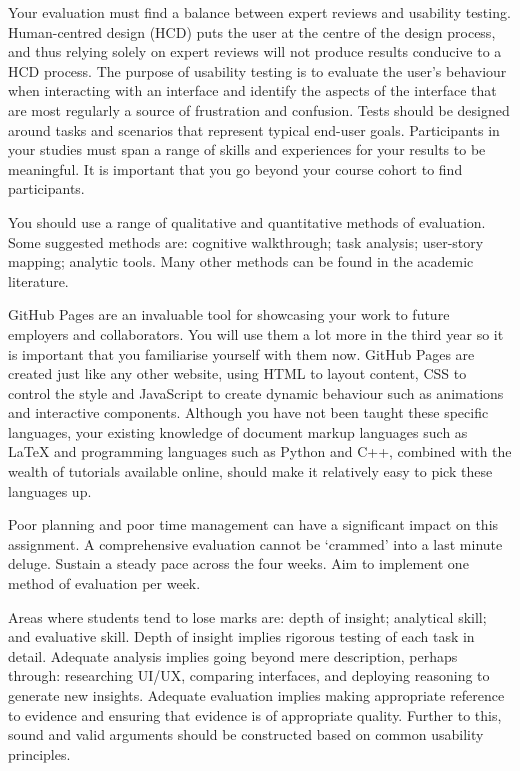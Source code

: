 \documentclass{../../fal_assignment}
\begin{document}
Your evaluation must find a balance between expert reviews and usability testing. Human-centred design (HCD) puts the user at the centre of the design process, and thus relying solely on expert reviews will not produce results conducive to a HCD process. The purpose of usability testing is to evaluate the user's behaviour when interacting with an interface and identify the aspects of the interface that are most regularly a source of frustration and confusion. Tests should be designed around tasks and scenarios that represent typical end-user goals. Participants in your studies must span a range of skills and experiences for your results to be meaningful. It is important that you go beyond your course cohort to find participants. 

You should use a range of qualitative and quantitative methods of evaluation. Some suggested methods are: cognitive walkthrough; task analysis; user-story mapping; analytic tools. Many other methods can be found in the academic literature.

GitHub Pages are an invaluable tool for showcasing your work to future employers and collaborators. You will use them a lot more in the third year so it is important that you familiarise yourself with them now. GitHub Pages are created just like any other website, using HTML to layout content, CSS to control the style and JavaScript to create dynamic behaviour such as animations and interactive components. Although you have not been taught these specific languages, your existing knowledge of document markup languages such as LaTeX and programming languages such as Python and C++, combined with the wealth of tutorials available online, should make it relatively easy to pick these languages up.

Poor planning and poor time management can have a significant impact on this assignment. A comprehensive evaluation cannot be `crammed' into a last minute deluge. Sustain a steady pace across the four weeks. Aim to implement one method of evaluation per week.

Areas where students tend to lose marks are: depth of insight; analytical skill; and evaluative skill. Depth of insight implies rigorous testing of each task in detail. Adequate analysis implies going beyond mere description, perhaps through: researching UI/UX, comparing interfaces, and deploying reasoning to generate new insights. Adequate evaluation implies making appropriate reference to evidence and ensuring that evidence is of appropriate quality. Further to this, sound and valid arguments should be constructed based on common usability principles. 
\end{document}
